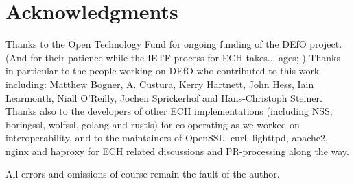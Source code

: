 \section*{Acknowledgments}

Thanks to the Open Technology Fund for ongoing funding of the DEfO
project. (And for their patience while the IETF process for ECH takes...
ages;-)
Thanks in particular to the people working on DEfO who contributed to this work
including:
Matthew Bogner,
A. Custura,
Kerry Hartnett,
John Hess,
Iain Learmonth,
Niall O'Reilly,
Jochen Sprickerhof
and Hans-Christoph Steiner.
Thanks also to the developers of other ECH implementations (including
NSS, boringssl, wolfssl, golang and rustls) for co-operating as we worked on
interoperability, and to the maintainers of OpenSSL, curl, lighttpd, apache2,
nginx and haproxy for ECH related discussions and PR-processing along the way.

All errors and omissions of course remain the fault of the author.
